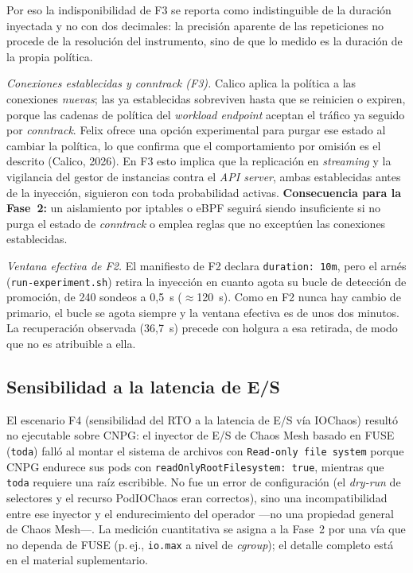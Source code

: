 Por eso la indisponibilidad de F3 se reporta como indistinguible de la duración inyectada y no con
dos decimales: la precisión aparente de las repeticiones no procede de la resolución del
instrumento, sino de que lo medido es la duración de la propia política.

\textit{Conexiones establecidas y conntrack (F3).}
Calico aplica la política a las conexiones \emph{nuevas}; las ya establecidas sobreviven hasta que
se reinicien o expiren, porque las cadenas de política del \textit{workload endpoint} aceptan el
tráfico ya seguido por \textit{conntrack}. Felix ofrece una opción experimental para purgar ese
estado al cambiar la política, lo que confirma que el comportamiento por omisión es el descrito
(Calico, 2026). En F3 esto implica que la replicación en \textit{streaming} y la vigilancia del
gestor de instancias contra el \textit{API server}, ambas establecidas antes de la inyección,
siguieron con toda probabilidad activas. \textbf{Consecuencia para la Fase~2:} un aislamiento por
iptables o eBPF seguirá siendo insuficiente si no purga el estado de \textit{conntrack} o emplea
reglas que no exceptúen las conexiones establecidas.

\textit{Ventana efectiva de F2.}
El manifiesto de F2 declara \texttt{duration: 10m}, pero el arnés (\texttt{run-experiment.sh})
retira la inyección en cuanto agota su bucle de detección de promoción, de 240 sondeos a 0,5~s
($\approx$120~s). Como en F2 nunca hay cambio de primario, el bucle se agota siempre y la ventana
efectiva es de unos dos minutos. La recuperación observada (36,7~s) precede con holgura a esa
retirada, de modo que no es atribuible a ella.

\subsection{Sensibilidad a la latencia de E/S}\label{sec:io}
El escenario F4 (sensibilidad del RTO a la latencia de E/S vía IOChaos) resultó no ejecutable sobre CNPG: el inyector de E/S de Chaos Mesh basado en FUSE (\texttt{toda}) falló al montar el sistema de archivos con \texttt{Read-only file system} porque CNPG endurece sus pods con \texttt{readOnlyRootFilesystem: true}, mientras que \texttt{toda} requiere una raíz escribible. No fue un error de configuración (el \textit{dry-run} de selectores y el recurso PodIOChaos eran correctos), sino una incompatibilidad entre ese inyector y el endurecimiento del operador —no una propiedad general de Chaos Mesh—. La medición cuantitativa se asigna a la Fase~2 por una vía que no dependa de FUSE (p.\,ej., \texttt{io.max} a nivel de \textit{cgroup}); el detalle completo está en el material suplementario.

